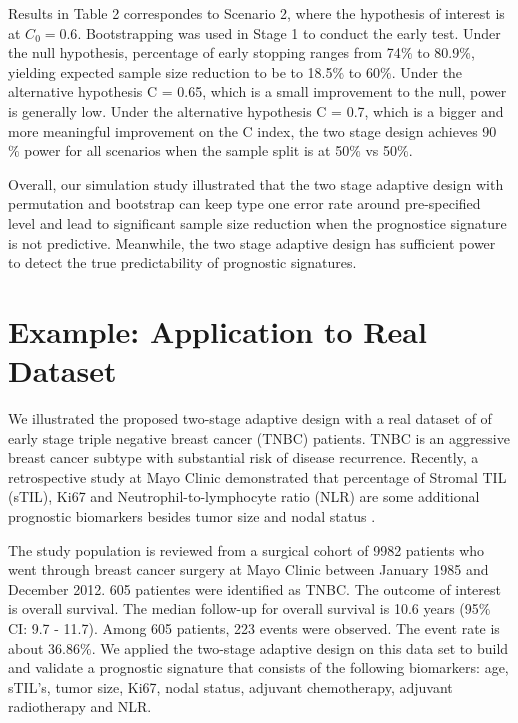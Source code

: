 \documentclass[11pt]{article}
\begin{document}
	\par Results in Table 2 correspondes to Scenario 2, where the hypothesis of interest is at $C_0 = 0.6$. Bootstrapping was used in Stage 1 to conduct the early test. Under the null hypothesis, percentage of early stopping ranges from 74$\%$ to 80.9$\%$, yielding expected sample size reduction to be to 18.5$\%$ to 60$\%$. Under the alternative hypothesis C = 0.65, which is a small improvement to the null, power is generally low. Under the alternative hypothesis C = 0.7, which is a bigger and more meaningful improvement on the C index, the two stage design achieves 90 $\%$ power for all scenarios when the sample split is at 50$\%$ vs 50$\%$.
	
	\par Overall, our simulation study illustrated that the two stage adaptive design with permutation and bootstrap can keep type one error rate around pre-specified level and lead to significant sample size reduction when the prognostice signature is not predictive. Meanwhile, the two stage adaptive design has sufficient power to detect the true predictability of prognostic signatures.




\section{Example: Application to Real Dataset}
	\par We illustrated the proposed two-stage adaptive design with a real dataset of of early stage triple negative breast cancer (TNBC) patients. TNBC is an aggressive breast cancer subtype with substantial risk of disease recurrence. Recently, a retrospective study at Mayo Clinic demonstrated that percentage of Stromal TIL (sTIL), Ki67 and Neutrophil-to-lymphocyte ratio (NLR) are some additional prognostic biomarkers besides tumor size and nodal status \citep{Leon-Ferre2018}. 
	\par The study population is reviewed from a surgical cohort of 9982 patients who went through breast cancer surgery at Mayo Clinic between January 1985 and December 2012. 605 patientes were identified as TNBC. The outcome of interest is overall survival. The median follow-up for overall survival is 10.6 years (95$\%$ CI: 9.7 - 11.7). Among 605 patients, 223 events were observed. The event rate is about $36.86 \%$. We applied the two-stage adaptive design on this data set to build and validate a prognostic signature that consists of the following biomarkers: age, sTIL's, tumor size, Ki67, nodal status, adjuvant chemotherapy, adjuvant radiotherapy and NLR.
\end{document}

